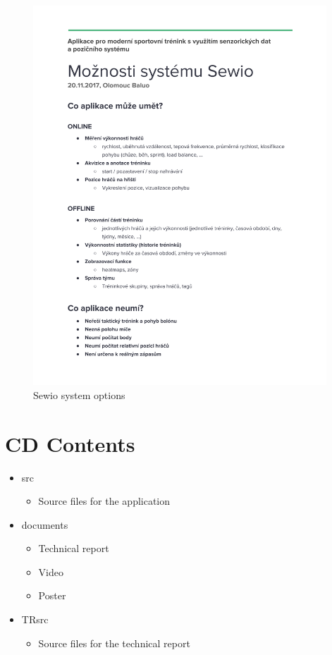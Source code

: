 \begin{figure}[htb]
\begin{center}
  \includegraphics*[width=11cm,keepaspectratio]{images/sysopts}
\end{center}
\caption{Sewio system options}
\label{img:sysopts}
\end{figure}

\chapter{CD Contents}
\begin{itemize}
	\item src
      \begin{itemize}
      	\item Source files for the application
      \end{itemize}
    \item documents
      \begin{itemize}
         \item Technical report
         \item Video
         \item Poster
       \end{itemize}
    \item TRsrc
      \begin{itemize}
      	\item Source files for the technical report
      \end{itemize}
\end{itemize}

